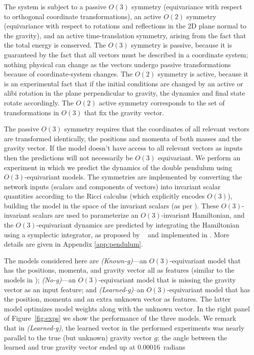 \documentclass[accepted]{article}
\newcommand{\figref}[1]{Figure~\ref{#1}}
\begin{document}
The system is subject to a passive $O(3)$ symmetry (equivariance with respect to orthogonal coordinate transformations), an active $O(2)$ symmetry (equivariance with respect to rotations and reflections in the 2D plane normal to the gravity), and an active time-translation symmetry, arising from the fact that the total energy is conserved. 
The $O(3)$ symmetry is passive, because it is guaranteed by the fact that all vectors must be described in a coordinate system; nothing physical can change as the vectors undergo passive transformations because of coordinate-system changes.
The $O(2)$ symmetry is active, because it is an experimental fact that if the initial conditions are changed by an active or alibi rotation in the plane perpendicular to gravity, the dynamics and final state rotate accordingly.
The $O(2)$ active symmetry corresponds to the set of transformations in $O(3)$ that fix the gravity vector. 


The passive $O(3)$ symmetry requires that the coordinates of all relevant vectors are transformed identically, the positions and momenta of both masses and the gravity vector.
If the model doesn't have access to all relevant vectors as inputs then the predictions will not necessarily be $O(3)$ equivariant.
We perform an experiment in which we predict the dynamics of the double pendulum using $O(3)$-equivariant models.
The symmetries are implemented by converting the network inputs (scalars and components of vectors) into invariant scalar quantities according to the Ricci calculus (which explicitly encodes $O(3)$), building the model in the space of the invariant scalars (as per \citealt{villar2021scalars}). These $O(3)$-invariant scalars are used to parameterize an $O(3)$-invariant Hamiltonian, and the $O(3)$-equivariant dynamics are predicted by integrating the Hamiltonian using a symplectic integrator, as proposed by ~\cite{sanchez-gonzalez2019hamiltonian} and implemented in \cite{yao2019experimental}. More details are given in Appendix \ref{app:pendulum}.

The models considered here are \textsl{(Known-g)}---an $O(3)$-equivariant model that has the positions, momenta, and gravity vector all as features (similar to the models in \citealt{villar2021scalars, yao2021simple}); \textsl{(No-g)}---an $O(3)$-equivariant model that is missing the gravity vector as an input feature; and \textsl{(Learned-g)}\---an $O(3)$-equivariant model that has the position, momenta and an extra unknown vector as features.
The latter model optimizes model weights along with the unknown vector. 
In the right panel of \figref{fig:exps} we show the performance of the three models.
We remark that in \textsl{(Learned-g)}, the learned vector in the performed experiments was nearly parallel to the true (but unknown) gravity vector $g$; the angle between the learned and true gravity vector ended up at 0.00016~radians
\end{document}
